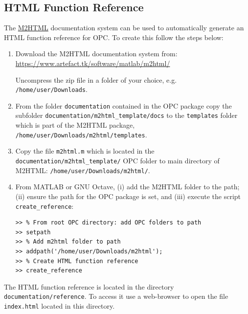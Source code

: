 \documentclass{book}
\begin{document}
\subsection{HTML Function Reference}

The
%
\href{https://www.artefact.tk/software/matlab/m2html/}{M2HTML}
%
documentation system can be used to automatically generate an HTML function
reference for OPC. To create this follow the steps below:

\begin{enumerate}

\item Download the M2HTML documentation system from:
%
\url{https://www.artefact.tk/software/matlab/m2html/}

Uncompress the zip file in a folder of your choice, e.g.
{\tt /home/user/Downloads}.

\item From the folder {\tt documentation} contained in the OPC package copy the subfolder
{\tt documentation/m2html\_template/docs} 
%
to the {\tt templates} folder which is part of the M2HTML package,
{\tt /home/user/Downloads/m2html/templates}.

\item Copy the file 
{\tt m2html.m} which is located in the {\tt documentation/m2html\_template/} OPC folder
to main directory of M2HTML: 
{\tt /home/user/Downloads/m2html/}.

\item From MATLAB or GNU Octave, (i) add the M2HTML folder to the path;
(ii) ensure the path for the OPC package is set, and (iii) execute
the script {\tt create\_reference}:

\begin{verbatim}
>> % From root OPC directory: add OPC folders to path 
>> setpath
>> % Add m2html folder to path
>> addpath('/home/user/Downloads/m2html');
>> % Create HTML function reference
>> create_reference
\end{verbatim}

\end{enumerate}

\noindent
%
The HTML function reference is located in the directory {\tt
documentation/reference}.  To access it use a web-browser to open the file {\tt
index.html} located in this directory.




\end{document}
